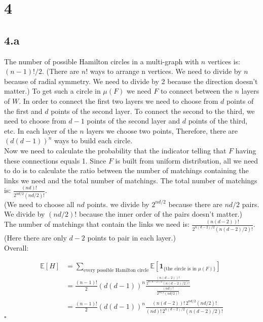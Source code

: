 \documentclass{article}
\begin{document}
\section*{4}
\subsection*{4.a}

The number of possible Hamilton circles in a multi-graph with $n$ vertices is: $(n-1)!/2$.
(There are $n!$ ways to arrange n vertices. We need to divide by $n$ because of radial symmetry. We need to divide by 2 because the direction doesn't matter.)
To get such a circle in $\mu(F)$ we need $F$ to connect between the $n$ layers of $W$. In order to connect the first two layers we need to choose from $d$ points of the first and $d$ points of the second layer. To connect the second to the third, we need to choose from $d-1$ points of the second layer and $d$ points of the third, etc. In each layer of the $n$ layers we choose two points, Therefore, there are $(d(d-1))^n$ ways to build each circle.\\
Now we need to calculate the probability that the indicator telling that $F$ having these connections equals 1.
Since $F$ is built from uniform distribution, all we need to do is to calculate the ratio between the number of matchings containing the links we need and the total number of matchings. 
The total number of matchings is: $\frac{(nd)!}{2^{nd/2}(nd/2)!}$.\\
(We need to choose all $nd$ points. we divide by $2^{nd/2}$ because there are $nd/2$ pairs. We divide by $(nd/2)!$ because the inner order of the pairs doesn't matter.)\\
The number of matchings that contain the links we need is: $\frac{(n(d-2))!}{2^{n(d-2)/2}(n(d-2)/2)!}$. \\
(Here there are only $d-2$ points to pair in each layer.)\\
Overall:

\begin{align*}
\mathbb{E}[H] 
  &= \sum_{\text{every possible Hamilton circle}}
      \mathbb{E}\!\left[ \mathbf{1}_{\{\text{the circle is in }\mu(F)\}} \right] \\[6pt]
  &= \frac{(n-1)!}{2}(d(d-1))^n
      \frac{\tfrac{(n(d-2))!}{2^{n(d-2)/2}(n(d-2)/2)!}}
           {\tfrac{(nd)!}{2^{nd/2}(nd/2)!}} \\[6pt]
  &= \frac{(n-1)!}{2}(d(d-1))^n
      \frac{(n(d-2))! \, 2^{nd/2}(nd/2)!}
           {(nd)! \, 2^{n(d-2)/2}(n(d-2)/2)!}
\end{align*}
\hfill $\square$
\end{document}
